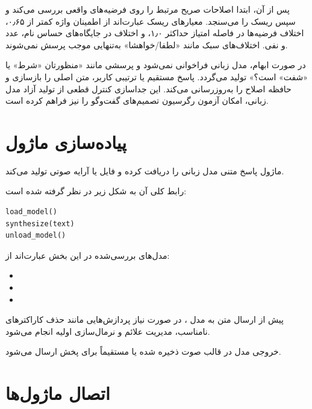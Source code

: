 پس از آن،  ابتدا اصلاحات صریح مرتبط
را روی فرضیه‌های واقعی  بررسی می‌کند و سپس ریسک را
می‌سنجد. معیارهای ریسک عبارت‌اند از اطمینان واژه کمتر از ۰٫۶۵،
اختلاف فرضیه‌ها در فاصله امتیاز حداکثر ۱٫۰، و اختلاف در
جایگاه‌های حساس نام، عدد و نفی. اختلاف‌های سبک مانند
«لطفا/خواهشا» به‌تنهایی موجب پرسش نمی‌شوند.

در صورت ابهام، مدل زبانی فراخوانی نمی‌شود و پرسشی مانند
«منظورتان «شرط» یا «شفت» است؟» تولید می‌گردد. پاسخ مستقیم یا
ترتیبی کاربر، متن اصلی را بازسازی و حافظه اصلاح را به‌روزرسانی
می‌کند. این جداسازی کنترل قطعی از تولید آزاد مدل زبانی، امکان
آزمون رگرسیون تصمیم‌های گفت‌وگو را نیز فراهم کرده است.


\section{پیاده‌سازی ماژول }

ماژول  پاسخ متنی مدل زبانی را دریافت کرده و فایل یا آرایه
صوتی تولید می‌کند.

رابط کلی آن به شکل زیر در نظر گرفته شده است:

\begin{latin}\begin{verbatim}
load_model()
synthesize(text)
unload_model()
\end{verbatim}\end{latin}

مدل‌های بررسی‌شده در این بخش عبارت‌اند از:

\begin{itemize}

    \item {}
    \item {}
    \item {}

\end{itemize}

پیش از ارسال متن به مدل ، در صورت نیاز پردازش‌هایی مانند
حذف کاراکترهای نامناسب، مدیریت علائم و نرمال‌سازی اولیه انجام
می‌شود.

خروجی مدل در قالب صوت ذخیره شده یا مستقیماً برای پخش ارسال
می‌شود.


\section{اتصال ماژول‌ها}

